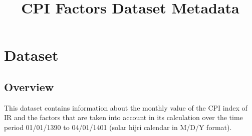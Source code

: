 \documentclass[fleqn]{report}
\begin{document}
\pagestyle{fancy}
\fancyhf{}

\title{CPI Factors Dataset Metadata}
\date{}
\maketitle

\newpage

\chapter*{Dataset}
\section*{Overview}
This dataset contains information about the monthly value of the CPI index of IR and the factors that are taken into account in its calculation over the time period 01/01/1390 to 04/01/1401 (solar hijri calendar in M/D/Y format).
\end{document}
